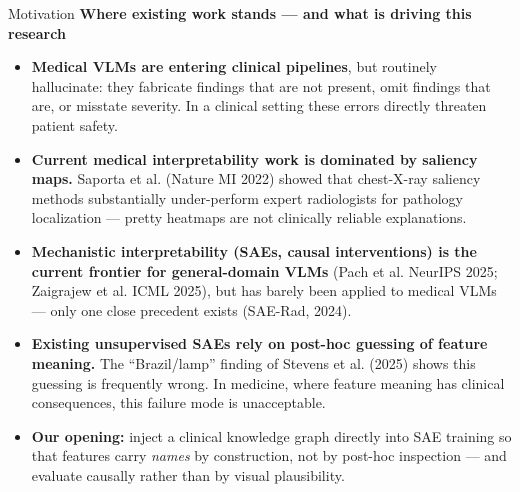 \documentclass[aspectratio=169,11pt]{beamer}
\begin{document}
\begin{frame}{Motivation}
    \textbf{Where existing work stands --- and what is driving this research}

    \vspace{0.5em}
    \begin{itemize}
        \item \textbf{Medical VLMs are entering clinical pipelines}, but routinely hallucinate: they fabricate findings that are not present, omit findings that are, or misstate severity. In a clinical setting these errors directly threaten patient safety.

        \item \textbf{Current medical interpretability work is dominated by saliency maps.} Saporta et al. (Nature MI 2022) showed that chest-X-ray saliency methods substantially under-perform expert radiologists for pathology localization --- pretty heatmaps are not clinically reliable explanations.

        \item \textbf{Mechanistic interpretability (SAEs, causal interventions) is the current frontier for general-domain VLMs} (Pach et al. NeurIPS 2025; Zaigrajew et al. ICML 2025), but has barely been applied to medical VLMs --- only one close precedent exists (SAE-Rad, 2024).

        \item \textbf{Existing unsupervised SAEs rely on post-hoc guessing of feature meaning.} The ``Brazil/lamp'' finding of Stevens et al. (2025) shows this guessing is frequently wrong. In medicine, where feature meaning has clinical consequences, this failure mode is unacceptable.

        \item \textbf{Our opening:} inject a clinical knowledge graph directly into SAE training so that features carry \emph{names} by construction, not by post-hoc inspection --- and evaluate causally rather than by visual plausibility.
    \end{itemize}
\end{frame}
\end{document}
